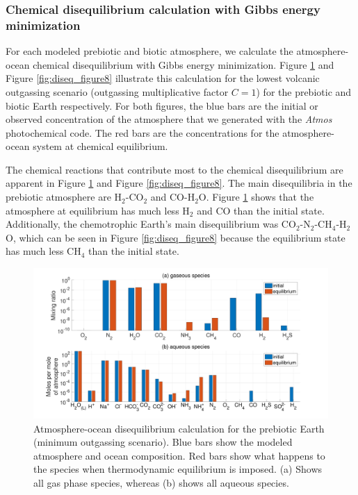 \subsubsection{Chemical disequilibrium calculation with Gibbs energy minimization}

For each modeled prebiotic and biotic atmosphere, we calculate the atmosphere-ocean chemical disequilibrium with Gibbs energy minimization. Figure \ref{fig:diseq_figure7} and Figure \ref{fig:diseq_figure8} illustrate this calculation for the lowest volcanic outgassing scenario (outgassing multiplicative factor $C = 1$) for the prebiotic and biotic Earth respectively. For both figures, the blue bars are the initial or observed concentration of the atmosphere that we generated with the \textit{Atmos} photochemical code. The red bars are the concentrations for the atmosphere-ocean system at chemical equilibrium.

The chemical reactions that contribute most to the chemical disequilibrium are apparent in Figure \ref{fig:diseq_figure7} and Figure \ref{fig:diseq_figure8}. The main disequilibria in the prebiotic atmosphere are H$_2$-CO$_2$ and CO-H$_2$O. Figure \ref{fig:diseq_figure7} shows that the atmosphere at equilibrium has much less H$_2$ and CO than the initial state. Additionally, the chemotrophic Earth's main disequilibrium was CO$_2$-N$_2$-CH$_4$-H$_2$O, which can be seen in Figure \ref{fig:diseq_figure8} because the equilibrium state has much less CH$_4$ than the initial state.

\begin{figure}
  \centering
  \includegraphics[width=1.0\textwidth]{tex/2diseq/Figure7.pdf}
  \caption{Atmosphere-ocean disequilibrium calculation for the prebiotic Earth (minimum outgassing scenario). Blue bars show the modeled atmosphere and ocean composition. Red bars show what happens to the species when thermodynamic equilibrium is imposed. (a) Shows all gas phase species, whereas (b) shows all aqueous species.}
  \label{fig:diseq_figure7}
\end{figure}

